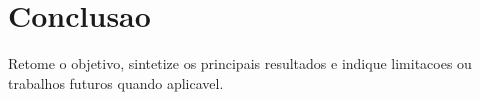 \chapter{Conclusao}

Retome o objetivo, sintetize os principais resultados e indique limitacoes ou trabalhos futuros quando aplicavel.

